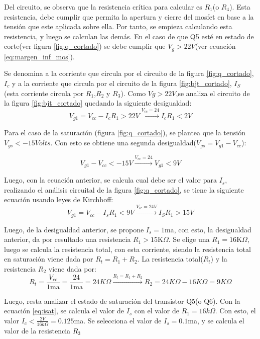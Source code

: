 Del circuito, se observa que la resistencia crítica para calcular es $R_{1}$(o $R_{4}$). Esta resistencia, debe cumplir que permita la apertura y cierre del mosfet en base a la tensión que este aplicada sobre ella. Por tanto, se empieza calculando esta resistencia, y luego se calculan las demás. 
En el caso de que Q5 esté en estado de corte(ver figura \ref{fig:q_cortado}) se debe cumplir que $V_{g}>22V $(ver ecuación \ref{eq:margen_inf_mos}). 
  
Se  denomina a la corriente que circula por el circuito de la figura \ref{fig:q_cortado}, $I_c$ y a la corriente que circula por el circuito de la figura \ref{fig:bjt_cortado}, $I_S$ (esta corriente circula por $R_1$,$R_2$ y $R_3$). Como $Vg>22V$,se analiza el circuito de la figura \ref{fig:bjt_cortado} quedando la siguiente desigualdad: 
\begin{equation}\label{eq:isat}
	V_{g1} = V_{cc} - I_cR_1>22V \xrightarrow{V_{cc} = 24 } I_cR_1<2V
\end{equation}

Para el caso de la saturación (figura \ref{fig:q_cortado}), se plantea que la tensión $V_{gs}<-15Volts$. Con esto se obtiene una segunda desigualdad($V_{gs}=V_{g1} - V_{cc}$):

\begin{equation}
	V_{g1} - V_{cc} <-15V \xrightarrow{ V_{cc}=24}V_{g1}<9V  
\end{equation}

Luego, con la ecuación anterior, se calcula cual debe ser el valor para $I_s$, realizando el análisis circuital de la figura \ref{fig:q_cortado}, se tiene la siguiente ecuación usando leyes de Kirchhoff: 
\begin{equation}
	V_{g1} = V_{cc} - I_sR_1<9V\xrightarrow{V_{cc}=24V} I_SR_1>15V
\end{equation}

Luego, de la desigualdad anterior, se propone $I_s=1$ma, con esto, la desigualdad anterior, da por resultado una resistencia $R_1>15$K$\Omega$. Se elige una $R_1=16$K$\Omega$, luego se calcula la resistencia total, con esta corriente, siendo la resistencia total en saturación viene dada por $R_t = R_1+R_2$. La resistencia total($R_t$) y la resistencia $R_2$ viene dada por: 
\begin{equation}
	R_t = \frac{V_{cc}}{1\text{ma}} =\frac{24}{1\text{ma}} = 24K\Omega\xrightarrow{R_t = R_1+R_2} R_2 = 24K\Omega - 16 K\Omega = 9K\Omega   
\end{equation}

Luego, resta analizar el estado de saturación del transistor Q5(o Q6). Con la ecuación \ref{eq:isat}, se calcula el valor de $I_s$ con el valor de $R_1 = 16k\Omega$. Con esto, el valor $I_c<\frac{2V}{16k\Omega}=0.125$ma. Se selecciona el valor de $I_s=0.1$ma, y se calcula el valor de la resistencia $R_3$ 

